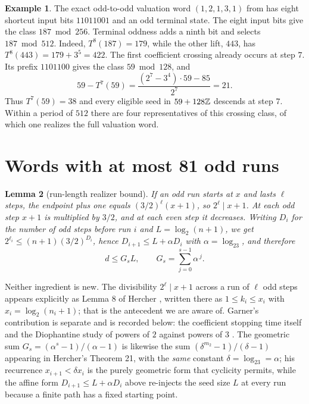 \documentclass[11pt,a4paper]{article}
\theoremstyle{plain}\newtheorem{theorem}{Theorem}\newtheorem{proposition}[theorem]{Proposition}
\newtheorem{lemma}[theorem]{Lemma}\newtheorem{corollary}[theorem]{Corollary}
\theoremstyle{definition}\newtheorem{example}[theorem]{Example}
\theoremstyle{remark}\newtheorem{remark}[theorem]{Remark}
\begin{document}
\begin{example}\label{ex:59}
The exact odd-to-odd valuation word $(1,2,1,3,1)$ from
\cite[App.~A.6(b)]{dj-floors2026} has eight shortcut input bits $11011001$ and an odd
terminal state. The eight input bits give the class $187\bmod 256$. Terminal oddness adds a
ninth bit and selects $187\bmod 512$. Indeed, $T^8(187)=179$, while the other lift, $443$,
has $T^8(443)=179+3^5=422$. The first coefficient crossing already occurs at step $7$.
Its prefix $1101100$ gives the class $59\bmod128$, and
\[
 59-T^7(59)=\frac{(2^7-3^4)\cdot59-85}{2^7}=21.
\]
Thus $T^7(59)=38$ and every eligible seed in $59+128\mathbb{Z}$ descends at step $7$. Within a
period of $512$ there are four representatives of this crossing class, of which one realizes
the full valuation word.
\end{example}

\section{Words with at most 81 odd runs}\label{sec:75}
\begin{lemma}[run-length realizer bound]\label{lem:runbound}
If an odd run starts at $x$ and lasts $\ell$ steps, the endpoint plus one equals
$(3/2)^\ell(x+1)$, so $2^\ell\mid x+1$. At each odd step $x+1$ is multiplied by $3/2$,
and at each even step it decreases. Writing $D_i$ for the number of odd steps before run $i$
and $L=\log_2(n+1)$, we get $2^{\ell_i}\le(n+1)(3/2)^{D_i}$, hence $D_{i+1}\le L+\alpha D_i$ with
$\alpha=\log_23$, and therefore
\[
d\le G_sL,\qquad G_s=\sum_{j=0}^{s-1}\alpha^{\,j}.
\]
\end{lemma}

Neither ingredient is new. The divisibility $2^{\ell}\mid x+1$ across a run of $\ell$ odd
steps appears explicitly as Lemma 8 of Hercher \cite{hercher2023}, written there as
$1\le k_i\le x_i$ with $x_i=\log_2(n_i+1)$; that is the antecedent we are aware of. Garner's
contribution is separate and is recorded below: the coefficient stopping time itself
\cite[\S4]{garner1981} and the Diophantine study of powers of $2$ against powers of $3$
\cite[\S5--\S6]{garner1981}. The geometric sum $G_s=(\alpha^s-1)/(\alpha-1)$ is likewise the sum
$(\delta^{m_2}-1)/(\delta-1)$ appearing in Hercher's Theorem 21, with the \emph{same} constant
$\delta=\log_23=\alpha$; his recurrence $x_{i+1}<\delta x_i$ is the purely geometric form that
cyclicity permits, while the affine form $D_{i+1}\le L+\alpha D_i$ above re-injects the seed
size $L$ at every run because a finite path has a fixed starting point.
\end{document}
